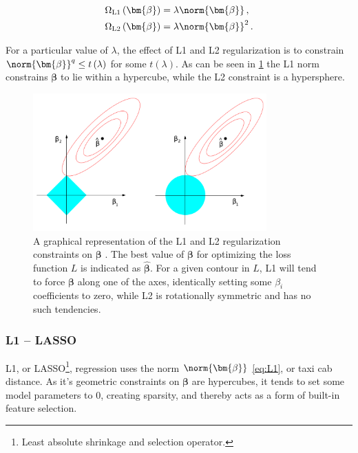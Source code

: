 \begin{subequations} \label{eq:L1_L2}
\begin{align}
\Omega_{\text{L1}}\left(\bm{\beta}\right) &= \lambda \norm{\bm{\beta}}\,,     \label{eq:L1} \\
\Omega_{\text{L2}}\left(\bm{\beta}\right) &= \lambda \norm{\bm{\beta}}^{2}\,. \label{eq:L2}
\end{align}
\end{subequations}

For a particular value of $\lambda$, the effect of L1 and L2 regularization
is to constrain $\norm{\bm{\beta}}^{q} \leq t\left(\lambda\right)$ for some $t\left(\lambda\right)$.
As can be seen in \cref{fig:ml:l1l2} the L1 norm constrains $\bm{\beta}$ to lie within a hypercube,
while the L2 constraint is a hypersphere.

\begin{figure}
\centering
\includegraphics[width=0.8\textwidth]{figures/ml/l1l2.png}
\caption{
A graphical representation of the L1 and L2 regularization constraints on $\bm{\beta}$ \cite{HastieTF09}.
The best value of $\bm{\beta}$ for optimizing the loss function $L$ is indicated as $\hat{\bm{\beta}}$.
For a given contour in $L$, L1 will tend to force $\bm{\beta}$ along one of the axes,
identically setting some $\beta_{i}$ coefficients to zero,
while L2 is rotationally symmetric and has no such tendencies.
}
\label{fig:ml:l1l2}
\end{figure}

\subsubsection{L1 -- LASSO}
\label{ml:general:reg:L1}
L1, or LASSO\footnote{Least absolute shrinkage and selection operator.},
regression uses the norm $\norm{\bm{\beta}}$ \cref{eq:L1}, or taxi cab distance.
As it's geometric constraints on $\bm{\beta}$ are hypercubes,
it tends to set some model parameters to 0, creating sparsity,
and thereby acts as a form of built-in feature selection.

